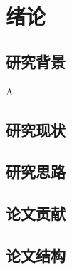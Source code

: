 \chapter{绪论}
\label{cha:intro}

\section{研究背景}
A~\cite{IEEE-1363}
\section{研究现状}
\section{研究思路}
\section{论文贡献}
\section{论文结构}

